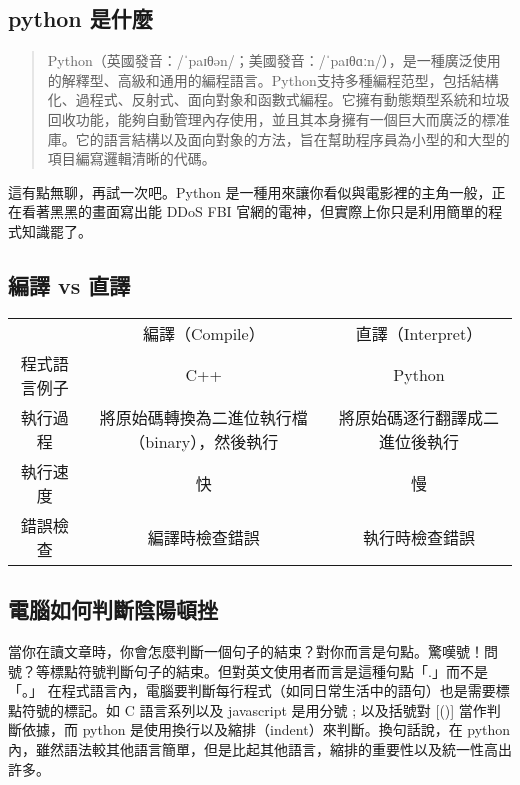 \documentclass{article}
\begin{document}

\begin{large}

\section{python 是什麼}
    \begin{quote}
        Python（英國發音：/ˈpaɪθən/；美國發音：/ˈpaɪθɑːn/），是一種廣泛使用的解釋型、高級和通用的編程語言。Python支持多種編程范型，包括結構化、過程式、反射式、面向對象和函數式編程。它擁有動態類型系統和垃圾回收功能，能夠自動管理內存使用，並且其本身擁有一個巨大而廣泛的標准庫。它的語言結構以及面向對象的方法，旨在幫助程序員為小型的和大型的項目編寫邏輯清晰的代碼。
    \end{quote}
    這有點無聊，再試一次吧。Python 是一種用來讓你看似與電影裡的主角一般，正在看著黑黑的畫面寫出能
    DDoS FBI 官網的電神，但實際上你只是利用簡單的程式知識罷了。

    \subsection{編譯 vs 直譯}
    \begin{tabular}{|c|c|c|}
\hline
& 編譯（Compile） & 直譯（Interpret） \\
程式語言例子 & C++ & Python \\
        執行過程 & 將原始碼轉換為二進位執行檔（binary），然後執行 &
        將原始碼逐行翻譯成二進位後執行 \\
執行速度 & 快 & 慢 \\
錯誤檢查 & 編譯時檢查錯誤 & 執行時檢查錯誤 \\
\hline
\end{tabular}
    \subsection{電腦如何判斷陰陽頓挫}
    當你在讀文章時，你會怎麼判斷一個句子的結束？對你而言是句點。驚嘆號！問號？等標點符號判斷句子的結束。但對英文使用者而言是這種句點「.」而不是「。」
    在程式語言內，電腦要判斷每行程式（如同日常生活中的語句）也是需要標點符號的標記。如 C
    語言系列以及 javascript 是用分號 ; 以及括號對 {[()]} 當作判斷依據，而 python
    是使用換行以及縮排（indent）來判斷。換句話說，在 python
    內，雖然語法較其他語言簡單，但是比起其他語言，縮排的重要性以及統一性高出許多。


\end{large}
\end{document}
